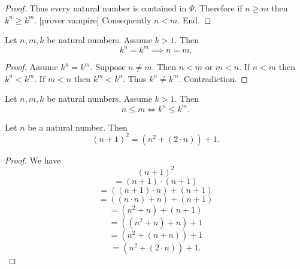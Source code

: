 \documentclass[10pt]{article}
\begin{document}
\begin{forthel}
\begin{proof}
        Thus every natural number is contained in $\Psi$.
        Therefore if $n \geq m$ then $k^{n} \geq k^{m}$.
        [prover vampire]
        Consequently $n < m$.
      End.
    \end{proof}
  \end{forthel}

  \begin{forthel}
    \begin{corollary}
      Let $n, m, k$ be natural numbers.
      Assume $k > 1$.
      Then \[ k^{n} = k^{m} \implies n = m. \]
    \end{corollary}
    \begin{proof}
      Assume $k^{n} = k^{m}$.
      Suppose $n \neq m$.
      Then $n < m$ or $m < n$.
      If $n < m$ then $k^{n} < k^{m}$.
      If $m < n$ then $k^{m} < k^{n}$.
      Thus $k^{n} \neq k^{m}$.
      Contradiction.
    \end{proof}
  \end{forthel}

  \begin{forthel}
    \begin{corollary}
      Let $n, m, k$ be natural numbers.
      Assume $k > 1$.
      Then \[ n \leq m \iff k^{n} \leq k^{m}. \]
    \end{corollary}
  \end{forthel}

  \begin{forthel}
    \begin{proposition}
      Let $n$ be a natural number.
      Then \[ (n + 1)^{2} = (n^{2} + (2 \cdot n)) + 1. \]
    \end{proposition}
    \begin{proof}
      We have
      \[  (n + 1)^{2}                       \]
      \[    = (n + 1) \cdot (n + 1)         \]
      \[    = ((n + 1) \cdot n) + (n + 1)   \]
      \[    = ((n \cdot n) + n) + (n + 1)   \]
      \[    = (n^{2} + n) + (n + 1)         \]
      \[    = ((n^{2} + n) + n) + 1         \]
      \[    = (n^{2} + (n + n)) + 1         \]
      \[    = (n^{2} + (2 \cdot n)) + 1.    \]
    \end{proof}
  \end{forthel}
\end{document}
